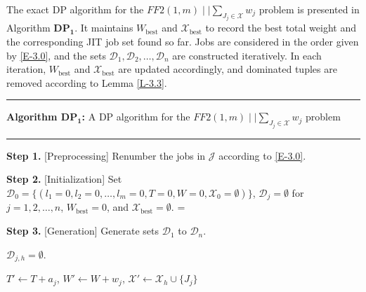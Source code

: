 \documentclass[12pt, eqno, limlimits]{article}
\begin{document}
\begin{sloppypar}
        
        The exact DP algorithm for the $FF2(1, m)\mid \mid \sum_{J_j \in \mathcal{X}} w_j$ problem is presented in Algorithm $\mathbf{DP_1}$. It maintains $W_{\text{best}}$ and $\mathcal{X}_{\text{best}}$ to record the best total weight and the corresponding JIT job set found so far. Jobs are considered in the order given by \eqref{E-3.0}, and the sets $\mathcal{D}_1, \mathcal{D}_{2}, \ldots, \mathcal{D}_{n}$ are constructed iteratively. In each iteration, $W_{\text{best}}$ and $\mathcal{X}_{\text{best}}$ are updated accordingly, and dominated tuples are removed according to Lemma \ref{L-3.3}. 
        
        \begin{algorithm}[tbp]  
            \small
            \linespread{1.2}\selectfont
            \SetAlgoLined
            \DontPrintSemicolon
            \hrule 
            \vspace{0.1cm}
            \textbf{Algorithm $\mathbf{DP_1}$:} A DP algorithm for the $FF2(1, m)\mid \mid \sum_{J_j \in \mathcal{X}} w_j$ problem
            \vspace{0.1cm}
            \hrule 
            \vspace{0.1cm}
            
            \LinesNumbered 
            \vspace{0.1cm}
            \textbf{Step 1.} [Preprocessing] Renumber the jobs in $\mathcal{J}$ according to \eqref{E-3.0}. \;
            
            \textbf{Step 2.} [Initialization] Set ${\mathcal D}_0=\{(l_1=0, l_2=0, \ldots, l_m=0, T=0, W=0, \mathcal{X}_0=\emptyset)\}$, $\mathcal{D}_j=\emptyset$ for $j=1, 2, \ldots, n$, $W_{\text{best}}=0$, and $\mathcal{X}_{\text{best}}=\emptyset$. \hspace*{\algorithmicindent}%
            \hangindent=\dimexpr{}\relax%
            
            \textbf{Step 3.} [Generation] Generate sets $\mathcal{D}_1$ to $\mathcal{D}_n$. \;
            
            {
                {          %
                    {$\mathcal{D}_{j,h}=\emptyset$.\;
                        
                        { 	
                            {
                                $T' \gets T + a_j$, $W' \gets W + w_j$, $\mathcal{X}' \gets \mathcal{X}_h \cup \{J_j\}$ \;
                                
}}}}}
\end{algorithm}
\end{sloppypar}
\end{document}
